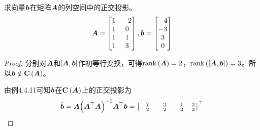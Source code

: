 \begin{problem}
求向量\(\boldsymbol{b}\)在矩阵\(\boldsymbol{A}\)的列空间中的正交投影。
\begin{equation*}
    \boldsymbol{A}=
    \begin{bmatrix}
        1 & -2 \\
        1 & 0  \\
        1 & 1  \\
        1 & 3
    \end{bmatrix},
    \boldsymbol{b}=\begin{bmatrix}-4\\-3\\3\\0\end{bmatrix}
\end{equation*}
\end{problem}
\begin{proof}
    分别对\(\boldsymbol{A}\)和\(\left[ \boldsymbol{A},\boldsymbol{b} \right]\)作初等行变换，可得\(\mathrm{rank}\left( \boldsymbol{A} \right)=2\)，\(\mathrm{rank}\left( \left[ \boldsymbol{A},\boldsymbol{b} \right] \right)=3\)。所以\(\boldsymbol{b}\notin\boldsymbol{\mathrm{C}}\left( \boldsymbol{A} \right)\)。

    由例4.4.11可知\(\boldsymbol{b}\)在\(\boldsymbol{\mathrm{C}}\left( \boldsymbol{A} \right)\)上的正交投影为
    \begin{equation*}
        \hat{\boldsymbol{b}}=\boldsymbol{A}{\left( \boldsymbol{A}^\top\boldsymbol{A} \right)}^{-1}\boldsymbol{A}^\top\boldsymbol{b}=
        \begin{bmatrix}
            -\frac{7}{2} & -\frac{3}{2} & -\frac{1}{2} & \frac{3}{2}
        \end{bmatrix}^\top
    \end{equation*}
\end{proof}

